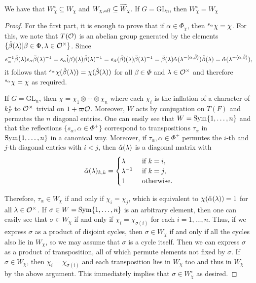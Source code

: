     \begin{lemma}
        We have that $W_\chi^\circ\subseteq W_\chi$ and $W_{\chi,\mathrm{aff}}\subseteq \widetilde{W}_\chi$. If $G=\mathrm{GL}_n$, then $W_\chi^\circ= W_\chi$
    \end{lemma}
    \begin{proof}
        For the first part, it is enough to prove that if $\alpha\in\Phi_\chi$, then $\prescript{s_\alpha}{}{\chi}=\chi$. For this, we note that $T(\mathcal{O})$ is an abelian group generated by the elements $\{\check{\beta}(\lambda)|\beta\in\Phi,\lambda\in\mathcal{O}^\times\}$. Since 
        $$s_\alpha^{-1}\check{\beta}(\lambda)s_\alpha\check{\beta}(\lambda)^{-1}=\check{s_\alpha(\beta)}(\lambda)\check{\beta}(\lambda)^{-1}=s_{\check{\alpha}}(\check{\beta})(\lambda)\check{\beta}(\lambda)^{-1}=\check{\beta}(\lambda)\check{\alpha}(\lambda^{-\langle\alpha,\check{\beta}\rangle})\check{\beta}(\lambda)=\check{\alpha}(\lambda^{-\langle\alpha,\check{\beta}\rangle}),$$
        it follows that $\prescript{s_\alpha}{}{\chi}(\check{\beta}(\lambda))=\chi(\check{\beta}(\lambda))$ for all $\beta\in\Phi$ and $\lambda\in\mathcal{O}^\times$ and therefore $\prescript{s_\alpha}{}{\chi}=\chi$ as required.

        If $G=\mathrm{GL}_n$, then $\chi=\chi_1\otimes\cdots\otimes\chi_n$ where each $\chi_i$ is the inflation of a character of $k_F^\times$ to $\mathcal{O}^\times$ trivial on $1+\varpi\mathcal{O}$. Moreover, $W$ acts by conjugation on $T(F)$ and permutes the $n$ diagonal entries. One can easily see that $W=\mathrm{Sym}\{1,\ldots,n\}$ and that the reflections $\{s_\alpha, \alpha\in\Phi^+\}$ correspond to transpositions $\tau_\alpha$ in $\mathrm{Sym}\{1,\ldots,n\}$ in a canonical way. Moreover, if $\tau_\alpha,\alpha\in\Phi^+$ permutes the $i$-th and $j$-th diagonal entries with $i<j$, then $\check{\alpha}(\lambda)$ is a diagonal matrix with 
        $$\check{\alpha}(\lambda)_{k,k}=\begin{cases}
            \lambda &\text{ if } k=i,\\
            \lambda^{-1} &\text{ if } k=j,\\
            1 &\text{ otherwise.}
        \end{cases}$$
        
        Therefore, $\tau_\alpha\in W_\chi$ if and only if $\chi_i=\chi_j$, which is equivalent to $\chi(\check{\alpha}(\lambda))=1$ for all $\lambda\in\mathcal{O}^\times$. If $\sigma\in W=\mathrm{Sym}\{1,\ldots,n\}$ is an arbitrary element, then one can easily see that $\sigma\in W_\chi$ if and only if $\chi_i=\chi_{\sigma(i)}$ for each $i=1,\ldots,n$. Thus, if we express $\sigma$ as a product of disjoint cycles, then $\sigma\in W_\chi$ if and only if all the cycles also lie in $W_\chi$, so we may assume that $\sigma$ is a cycle itself. Then we can express $\sigma$ as a product of transposition, all of which permute elements not fixed by $\sigma$. If $\sigma\in W_\chi$, then $\chi_i=\chi_{\sigma(i)}$ and each transposition lies in $W_\chi$ too and thus in $W_\chi^\circ$ by the above argument. This immediately implies that $\sigma\in W_\chi^\circ$ as desired. 
    \end{proof}

